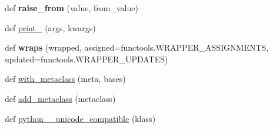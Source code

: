 \begin{DoxyCompactItemize}
\item 
\mbox{\label{namespacesetuptools_1_1__vendor_1_1six_a5a03a5f3107c9db430a197d8c938baa2}} 
def {\bfseries raise\+\_\+from} (value, from\+\_\+value)
\item 
def \hyperlink{namespacesetuptools_1_1__vendor_1_1six_a26fe6e846f37b3d30891c9e855598a8b}{print\+\_\+} (args, kwargs)
\item 
\mbox{\label{namespacesetuptools_1_1__vendor_1_1six_acd8b591ef0e62ed8c8af55b8a3474c01}} 
def {\bfseries wraps} (wrapped, assigned=functools.\+W\+R\+A\+P\+P\+E\+R\+\_\+\+A\+S\+S\+I\+G\+N\+M\+E\+N\+TS, updated=functools.\+W\+R\+A\+P\+P\+E\+R\+\_\+\+U\+P\+D\+A\+T\+ES)
\item 
def \hyperlink{namespacesetuptools_1_1__vendor_1_1six_ac0b0cdce288b7fa644dd1685820b7ad1}{with\+\_\+metaclass} (meta, bases)
\item 
def \hyperlink{namespacesetuptools_1_1__vendor_1_1six_ab513091306e8afbf73f01d8042d9dca0}{add\+\_\+metaclass} (metaclass)
\item 
def \hyperlink{namespacesetuptools_1_1__vendor_1_1six_a5b0c006d53a3cf81ffae1823a3617f0f}{python\+\_\+\_\+unicode\+\_\+compatible} (klass)
\end{DoxyCompactItemize}
